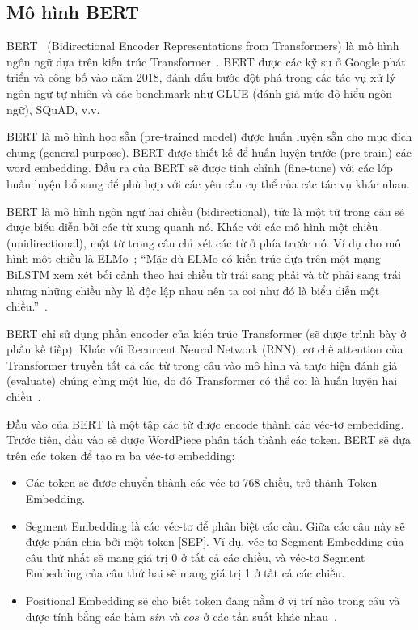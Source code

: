 \subsection{Mô hình BERT}
BERT~\cite{devlinBERTPretrainingDeep2019} (Bidirectional Encoder Representations from Transformers) là mô hình ngôn ngữ dựa trên kiến trúc Transformer~\cite{vaswaniAttentionAllYou2017}. BERT được các kỹ sư ở Google phát triển và công bố vào năm 2018, đánh dấu bước đột phá trong các tác vụ xử lý ngôn ngữ tự nhiên và các benchmark như GLUE (đánh giá mức độ hiểu ngôn ngữ), SQuAD, v.v.

BERT là mô hình học sẵn (pre-trained model) được huấn luyện sẵn cho mục đích chung (general purpose). BERT được thiết kế để huấn luyện trước (pre-train) các word embedding. Đầu ra của BERT sẽ được tinh chỉnh (fine-tune) với các lớp huấn luyện bổ sung để phù hợp với các yêu cầu cụ thể của các tác vụ khác nhau.

BERT là mô hình ngôn ngữ hai chiều (bidirectional), tức là một từ trong câu sẽ được biểu diễn bởi các từ xung quanh nó. Khác với các mô hình một chiều (unidirectional), một từ trong câu chỉ xét các từ ở phía trước nó. Ví dụ cho mô hình một chiều là ELMo~\cite{petersDeepContextualizedWord2018}; ``Mặc dù ELMo có kiến trúc dựa trên một mạng BiLSTM xem xét bối cảnh theo hai chiều từ trái sang phải và từ phải sang trái nhưng những chiều này là độc lập nhau nên ta coi như đó là biểu diễn một chiều.''~\cite{khanhBERTModel2020}.

BERT chỉ sử dụng phần encoder của kiến trúc Transformer (sẽ được trình bày ở phần kế tiếp). Khác với Recurrent Neural Network (RNN), cơ chế attention của Transformer truyền tất cả các từ trong câu vào mô hình và thực hiện đánh giá (evaluate) chúng cùng một lúc, do đó Transformer có thể coi là huấn luyện hai chiều~\cite{khanhBERTModel2020}.

Đầu vào của BERT là một tập các từ được encode thành các véc-tơ embedding.  Trước tiên, đầu vào sẽ được WordPiece phân tách thành các token. BERT sẽ dựa trên các token để tạo ra ba véc-tơ embedding:
\begin{itemize}
	\item Các token sẽ được chuyển thành các véc-tơ 768 chiều, trở thành Token Embedding.
	\item Segment Embedding là các véc-tơ để phân biệt các câu. Giữa các câu này sẽ được phân chia bởi một token [SEP]. Ví dụ, véc-tơ Segment Embedding của câu thứ nhất sẽ mang giá trị 0 ở tất cả các chiều, và véc-tơ Segment Embedding của câu thứ hai sẽ mang giá trị 1 ở tất cả các chiều.
	\item Positional Embedding sẽ cho biết token đang nằm ở vị trí nào trong câu và được tính bằng các hàm $sin$ và $cos$ ở các tần suất khác nhau~\cite{vaswaniAttentionAllYou2017}.
\end{itemize}


